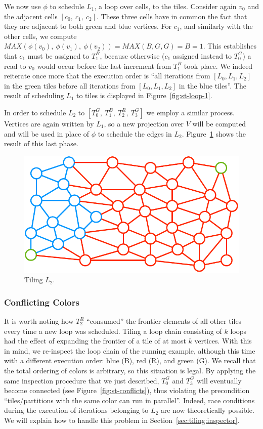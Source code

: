 We now use $\phi$ to schedule $L_1$, a loop over cells, to the tiles. Consider again $v_0$ and the adjacent cells $[c_0,\ c_1,\ c_2]$. These three cells have in common the fact that they are adjacent to both green and blue vertices. For $c_1$, and similarly with the other cells, we compute $MAX(\phi(v_0),\ \phi(v_1),\ \phi(v_2)) = MAX(B, G, G) = B = 1$. This establishes that $c_1$ must be assigned to $T_1^B$, because otherwise ($c_1$ assigned instead to $T_0^G$) a read to $v_0$ would occur before the last increment from $T_1^B$ took place. We indeed reiterate once more that the execution order is ``all iterations from $[L_0, L_1, L_2]$ in the green tiles before all iterations from $[L_0, L_1, L_2]$ in the blue tiles''. The result of scheduling $L_1$ to tiles is displayed in Figure~\ref{fig:st-loop-1}.

In order to schedule $L_2$ to $[T_0^G,\ T_1^B,\ T_2^R,\ T_3^G]$ we employ a similar process. Vertices are again written by $L_1$, so a new projection over $V$ will be computed and will be used in place of $\phi$ to schedule the edges in $L_2$. Figure~\ref{fig:st-loop-2} shows the result of this last phase. 

\begin{figure}[h]
\centering
\includegraphics[scale=0.7]{sparsetiling/figures/loop_2.pdf}
\caption{Tiling $L_2$.}
\label{fig:st-loop-2}
\end{figure}


\subsubsection*{Conflicting Colors}
It is worth noting how $T_2^R$ ``consumed'' the frontier elements of all other tiles every time a new loop was scheduled. Tiling a loop chain consisting of $k$ loops had the effect of expanding the frontier of a tile of at most $k$ vertices. With this in mind, we re-inspect the loop chain of the running example, although this time with a different execution order: blue (B), red (R), and green (G). We recall that the total ordering of colors is arbitrary, so this situation is legal. By applying the same inspection procedure that we just described, $T_0^G$ and $T_3^G$ will eventually become connected (see Figure~\ref{fig:st-conflicts}), thus violating the precondition ``tiles/partitions with the same color can run in parallel''. Indeed, race conditions during the execution of iterations belonging to $L_2$ are now theoretically possible. We will explain how to handle this problem in Section~\ref{sec:tiling:inspector}.

